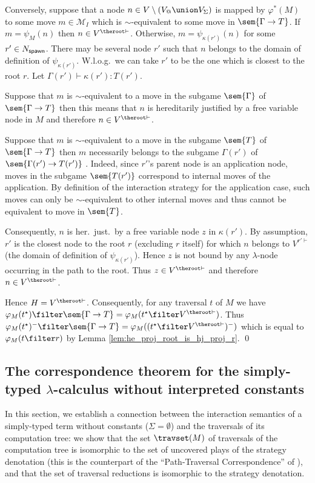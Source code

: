 Conversely, suppose that a node $n \in V\setminus (V_@\union V_\Sigma)$ is mapped by
$\varphi^*(M)$ to some move $m\in \mathcal{M}_I$ which is $\sim$-equivalent
to some move in $\sem{\Gamma \rightarrow T}$.
 If $m = \psi_M(n)$ then $n\in V^{\theroot\vdash}$. Otherwise,
$m = \psi_{\kappa(r')}(n)$ for some $r' \in N_{\sf spawn}$. There
may be several node $r'$ such that $n$ belongs to the domain of
definition of $\psi_{\kappa(r')}$. W.l.o.g.\ we can take $r'$ to be
the one which is closest to the root $r$. Let $\Gamma(r') \vdash
\kappa(r') : T(r')$.
    \begin{compactitem}
    \item Suppose that $m$ is $\sim$-equivalent to a move in the subgame $\sem{\Gamma}$ of $\sem{\Gamma \rightarrow T}$
    then this means that $n$ is hereditarily justified by a free variable node in $M$ and therefore $n \in V^{\theroot\vdash}$.

    \item Suppose that $m$ is $\sim$-equivalent to a move in the subgame $\sem{T}$ of $\sem{\Gamma \rightarrow T}$
    then $m$ necessarily belongs to the subgame $\Gamma(r')$ of $\sem{\Gamma(r')\rightarrow T(r')}$ .
    Indeed, since $r'$'s parent node is an application node, moves in the subgame
    $\sem{T(r')}$ correspond to internal moves of the application. By definition of
    the interaction strategy for the application case, such moves can only be $\sim$-equivalent to other internal
    moves and thus cannot be equivalent to move in $\sem{T}$.

    Consequently, $n$ is her.\ just.\ by a free variable node $z$ in $\kappa(r')$. By assumption, $r'$ is the closest node to the root $r$ (excluding $r$ itself) for which $n$ belongs to $V^{r'\vdash}$ (the domain of definition of $\psi_{\kappa(r')}$). Hence $z$ is not bound by any $\lambda$-node occurring in the path to the root. Thus $z\in
    V^{\theroot\vdash}$ and therefore $n \in V^{\theroot\vdash}$.
    \end{compactitem}
Hence $H = V^{\theroot\vdash}$. Consequently, for any traversal $t$
of $M$ we have $\varphi_M(t^\star) \filter \sem{\Gamma \rightarrow
T} = \varphi_M(t^\star\filter V^{\theroot\vdash})$. Thus
$\varphi_M(t^\star)^- \filter \sem{\Gamma \rightarrow T} =
\varphi_M((t^\star\filter V^{\theroot\vdash})^-)$ which is equal to
$ \varphi_M(t\filter r)$ by Lemma
\ref{lem:he_proj_root_is_hj_proj_r}. \qed


\subsection{The correspondence theorem for the simply-typed $\lambda$-calculus without interpreted constants}
In this section, we establish a connection between the interaction
semantics of a simply-typed term without constants ($\Sigma =
\emptyset$) and the traversals of its computation tree: we show that
the set $\travset(M)$ of traversals of the computation tree is
isomorphic to the set of uncovered plays of the strategy denotation
(this is the counterpart of the ``Path-Traversal Correspondence'' of
\cite{OngLics2006}), and that the set of traversal reductions is
isomorphic to the strategy denotation.


